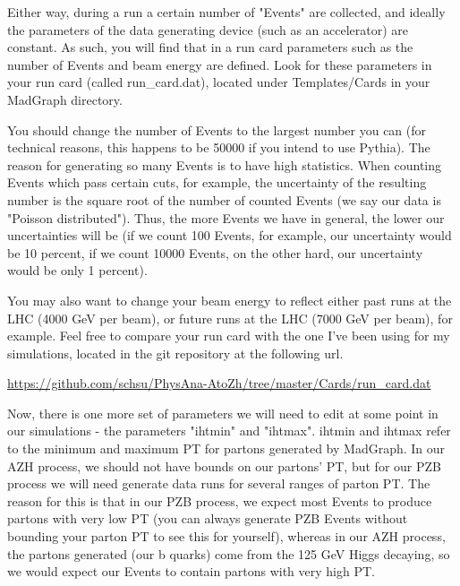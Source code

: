 \documentclass{article}
\begin{document}
\bigskip

Either way, during a run a certain number of "Events" are collected, and ideally the parameters of the data generating device (such as
an accelerator) are constant. As such, you will find that in a run card parameters such as the number of Events and beam energy are defined.
Look for these parameters in your run card (called run\_card.dat), located under Templates/Cards in your MadGraph directory.

\bigskip

You should change the number of Events to the largest number you can (for technical reasons, this happens to be 50000 if you intend to use Pythia).
The reason for generating so many Events is to have high statistics. When counting Events which pass certain cuts, for example, the uncertainty of
the resulting number is the square root of the number of counted Events (we say our data is "Poisson distributed"). Thus, the more Events we have
in general, the lower our uncertainties will be (if we count 100 Events, for example, our uncertainty would be 10 percent, if we count 10000 Events,
on the other hard, our uncertainty would be only 1 percent).

\bigskip

You may also want to change your beam energy to reflect either past runs at the LHC (4000 GeV per beam), or future runs at the LHC (7000 GeV per beam), for example.
Feel free to compare your run card with the one I've been using for my simulations, located in the git repository at the following url.

\bigskip

\url{https://github.com/schsu/PhysAna-AtoZh/tree/master/Cards/run_card.dat}

\bigskip

Now, there is one more set of parameters we will need to edit at some point in our simulations - the parameters "ihtmin" and "ihtmax".
ihtmin and ihtmax refer to the minimum and maximum PT for partons generated by MadGraph. In our AZH process, we should not have bounds
on our partons' PT, but for our PZB process we will need generate data runs for several ranges of parton PT. The reason for this is
that in our PZB process, we expect most Events to produce partons with very low PT (you can always generate PZB Events without bounding
your parton PT to see this for yourself), whereas in our AZH process, the partons generated (our b quarks) come from the 125 GeV Higgs decaying,
so we would expect our Events to contain partons with very high PT.
\end{document}
